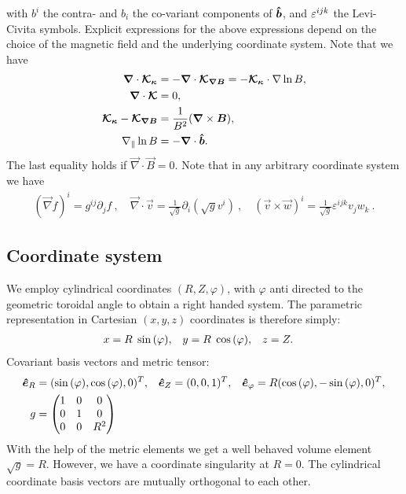 with $b^i$ the contra- and $b_i$ the co-variant components of $\bm{\hat{b}}$, and 
$\varepsilon^{ijk}$ the Levi-Civita symbols.
Explicit expressions for the above expressions
depend on the choice of the magnetic field and the underlying coordinate system.
    Note that we have
\begin{align}
    {\boldsymbol{\nabla}} \cdot {\boldsymbol{\mathcal K_\kappa}}
    &= -{\boldsymbol{\nabla}} \cdot {\boldsymbol{\mathcal K_{\nabla B}}} = -{\boldsymbol{ \mathcal K_\kappa}}\cdot\nabla\ln B, \\
    {\boldsymbol{\nabla}}\cdot{\boldsymbol{ \mathcal K}} &= 0, \\
    {\boldsymbol{ \mathcal K_\kappa}} - {\boldsymbol{ \mathcal K_{\nabla B}}} &= \frac{1}{B^2} ({\boldsymbol{\nabla}} \times {\boldsymbol{B}}), \\
    \nabla_\parallel \ln B &= -{\boldsymbol{\nabla}}\cdot\bm{\hat{b}}.
    \label{eq:curl_curvature}
\end{align}
The last equality holds if $\vec\nabla\cdot \vec B = 0$.
Note that in any arbitrary coordinate system we have
\begin{align}
(\vec \nabla f)^i = g^{ij}\partial_j f ~, \quad
\vec \nabla \cdot \vec v = \frac{1}{\sqrt{g}}\partial_i \left(\sqrt{g} v^i\right) ~, \quad
(\vec v \times \vec w)^i = \frac{1}{\sqrt{g}}\varepsilon^{ijk} v_jw_k ~.
\end{align}

\subsection{Coordinate system}\label{sec:cylmetric}
We employ cylindrical coordinates \( (R,Z,\varphi) \), with \(\varphi\) anti directed to the geometric toroidal angle to
obtain a right handed system. The parametric representation in Cartesian \((x,y,z)\) coordinates is therefore simply:
\begin{align}
 x &= R \hspace{1 mm} \sin{(\varphi)}, &
 y &= R \hspace{1 mm} \cos{(\varphi)}, &
 z &= Z .
\end{align}
Covariant
basis vectors and metric tensor:
\begin{align}
 \bm{\hat{e}}_R      &= (\sin{(\varphi)} ,   \cos{(\varphi)},0)^T, &
 \bm{\hat{e}}_Z      &= ( 0 ,0 ,1 )^T, &
 \bm{\hat{e}}_{\varphi} &= R ( \cos{(\varphi)} , -\sin{(\varphi)} , 0 )^T,
\\
 g &= \begin{pmatrix}
  1 & 0 & 0 \\
  0 & 1 & 0 \\
  0 & 0 & R^2
   \end{pmatrix}
\end{align}
With the help of the metric elements we get a well behaved volume element \(\sqrt{g} = R\). However, we have a coordinate singularity at \(R=0\).
The cylindrical coordinate basis vectors are mutually orthogonal to each other.

